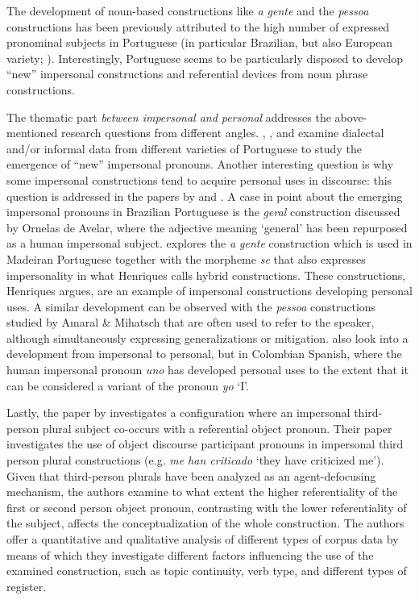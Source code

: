 \documentclass[output=paper]{langscibook}
\begin{document}
The development of noun-based constructions like \textit{a gente}  and the \textit{pessoa}  constructions has been previously attributed to the high number of expressed pronominal subjects in Portuguese (in particular Brazilian, but also European variety; \citealt{Posio2021}). Interestingly, Portuguese seems to be particularly disposed to develop “new” impersonal constructions and referential devices from noun phrase constructions.



The thematic part \textit{between impersonal and personal}  addresses the above-men\-tioned research questions from different angles. , , and  examine dialectal and/or informal data from different varieties of Portuguese to study the emergence of “new” impersonal pronouns. Another interesting question is why some impersonal constructions tend to acquire personal uses in discourse: this question is addressed in the papers by  and . A case in point about the emerging impersonal pronouns in Brazilian Portuguese is the \textit{geral} construction discussed by Ornelas de Avelar, where the adjective meaning ‘general’ has been repurposed as a human impersonal subject.  explores the \textit{a gente}  construction which is used in Madeiran Portuguese together with the morpheme \textit{se}  that also expresses impersonality in what Henriques calls hybrid constructions. These constructions, Henriques argues, are an example of impersonal constructions developing personal uses. A similar development can be observed with the \textit{pessoa}  constructions studied by Amaral \& Mihatsch that are often used to refer to the speaker, although simultaneously expressing generalizations or mitigation.  also look into a development from impersonal to personal, but in Colombian Spanish, where the human impersonal pronoun \textit{uno}  has developed personal uses to the extent that it can be considered a variant of the  pronoun \textit{yo} ‘I’. 



Lastly, the paper by  investigates a configuration where an impersonal third-person plural subject co-occurs with a referential object pronoun. Their paper investigates the use of object discourse participant pronouns in impersonal third person plural constructions (e.g. \textit{me han criticado}  ‘they have criticized me’). Given that third-person plurals have been analyzed as an agent-defocusing mechanism, the authors examine to what extent the higher referentiality of the first or second person object pronoun, contrasting with the lower referentiality of the subject, affects the conceptualization of the whole construction. The authors offer a quantitative and qualitative analysis of different types of corpus data by means of which they investigate different factors influencing the use of the examined construction, such as topic continuity, verb type, and different types of register.
\end{document}
